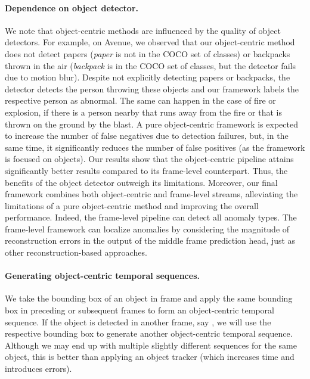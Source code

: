 \documentclass[final]{cvpr}
\begin{document}
\paragraph{Dependence on object detector.}
We note that object-centric methods are influenced by the quality of object detectors. For example, on Avenue, we observed that our object-centric method does not detect papers (\emph{paper} is not in the COCO set of classes) or backpacks thrown in the air (\emph{backpack} is in the COCO set of classes, but the detector fails due to motion blur). Despite not explicitly detecting papers or backpacks, the detector detects the person throwing these objects and our framework labels the respective person as abnormal. The same can happen in the case of fire or explosion, if there is a person nearby that runs away from the fire or that is thrown on the ground by the blast. A pure object-centric framework is expected to increase the number of false negatives due to detection failures, but, in the same time, it significantly reduces the number of false positives (as the framework is focused on objects). Our results show that the object-centric pipeline attains significantly better results compared to its frame-level counterpart. Thus, the benefits of the object detector outweigh its limitations. Moreover, our final framework combines both object-centric and frame-level streams, alleviating the limitations of a pure object-centric method and improving the overall performance. Indeed, the frame-level pipeline can detect all anomaly types. The frame-level framework can localize anomalies by considering the magnitude of reconstruction errors in the output of the middle frame prediction head, just as other reconstruction-based approaches.

\paragraph{Generating object-centric temporal sequences.}
We take the bounding box of an object  in frame  and apply the same bounding box in preceding or subsequent frames to form an object-centric temporal sequence. If the object  is detected in another frame, say , we will use the respective bounding box to generate another object-centric temporal sequence. Although we may end up with multiple slightly different sequences for the same object, this is better than applying an object tracker (which increases time and introduces errors). 
\end{document}
